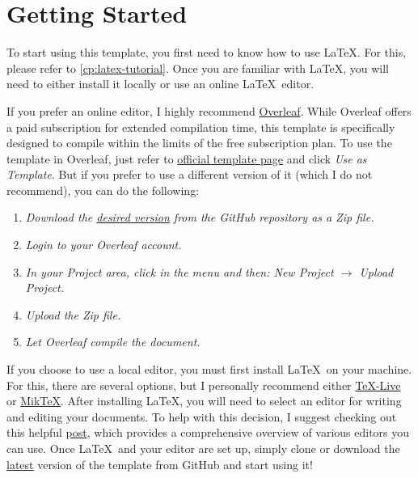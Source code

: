 {\section{Getting Started}
To start using this template, you first need to know how to use \LaTeX. For this, please refer to \autoref{cp:latex-tutorial}. Once you are familiar with \LaTeX, you will need to either install it locally or use an online \LaTeX~editor.

If you prefer an online editor, I highly recommend \href{https://www.overleaf.com/}{Overleaf}. While Overleaf offers a paid subscription for extended compilation time, this template is specifically designed to compile within the limits of the free subscription plan. To use the template in Overleaf, just refer to \href{https://www.overleaf.com/latex/templates/unofficial-polytechnic-university-of-leiria-estg-thesis-slash-report-template/tqgbrncfhwgt}{official template page} and click \textit{Use as Template}. But if you prefer to use a different version of it (which I do not recommend), you can do the following:

\begin{enumerate}[font=\itshape]
    \setlength{\itemsep}{.375em}
    \item \textit{Download the \href{https://github.com/joseareia/ipleiria-thesis/releases}{desired version} from the GitHub repository as a Zip file.}
    \item \textit{Login to your Overleaf account.}
    \item \textit{In your Project area, click in the menu and then: New Project \(\to\) Upload Project.}
    \item \textit{Upload the Zip file.}
    \item \textit{Let Overleaf compile the document.}
\end{enumerate}

If you choose to use a local editor, you must first install \LaTeX~on your machine. For this, there are several options, but I personally recommend either \href{https://www.tug.org/texlive/}{TeX-Live} or \href{https://miktex.org/}{MikTeX}. After installing \LaTeX, you will need to select an editor for writing and editing your documents. To help with this decision, I suggest checking out this helpful \href{https://tex.stackexchange.com/questions/339/latex-editors-ides}{post}, which provides a comprehensive overview of various editors you can use. Once \LaTeX~and your editor are set up, simply clone or download the \href{https://github.com/joseareia/ipleiria-thesis/releases}{latest} version of the template from GitHub and start using it!

}
